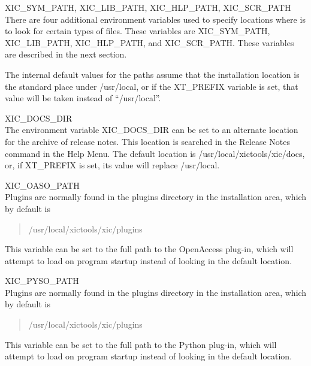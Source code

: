 \begin{description}
\item{{\et XIC\_SYM\_PATH}, {\et XIC\_LIB\_PATH}, {\et XIC\_HLP\_PATH},
  {\et XIC\_SCR\_PATH}}\\
There are four additional environment variables used to specify
locations where {\Xic} is to look for certain types of files.  These
variables are {\et XIC\_SYM\_PATH}, {\et XIC\_LIB\_PATH}, {\et
XIC\_HLP\_PATH}, and {\et XIC\_SCR\_PATH}.  These variables are
described in the next section.

The internal default values for the paths assume that the installation
location is the standard place under {\vt /usr/local}, or if the {\et
XT\_PREFIX} variable is set, that value will be taken instead of
``{\vt /usr/local}''.

\item{\et XIC\_DOCS\_DIR}\\
The environment variable {\et XIC\_DOCS\_DIR} can be set to an
alternate location for the archive of release notes.  This location is
searched in the {\cb Release Notes} command in the {\cb Help Menu}. 
The default location is {\vt /usr/local/xictools/xic/docs}, or,
if {\et XT\_PREFIX} is set, its value will replace {\vt /usr/local}.

{}
\item{\et XIC\_OASO\_PATH}\\
Plugins are normally found in the {\vt plugins} directory in the
installation area, which by default is
\begin{quote}
\vt /usr/local/xictools/xic/plugins
\end{quote}
This variable can be set to the full path to the OpenAccess plug-in,
which {\Xic} will attempt to load on program startup instead of
looking in the default location.

\item{\et XIC\_PYSO\_PATH}\\
Plugins are normally found in the {\vt plugins} directory in the
installation area, which by default is
\begin{quote}
\vt /usr/local/xictools/xic/plugins
\end{quote}
This variable can be set to the full path to the Python plug-in,
which {\Xic} will attempt to load on program startup instead of
looking in the default location.


\end{description}
